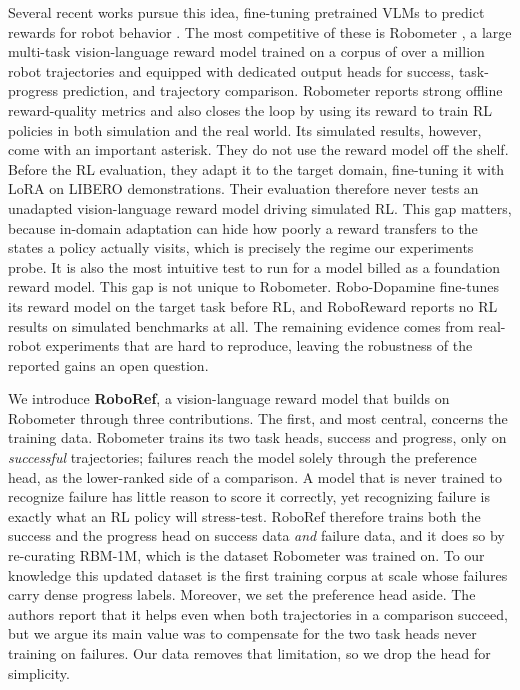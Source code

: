 Several recent works pursue this idea, fine-tuning pretrained VLMs to predict rewards for robot behavior \citep{robodopamine, roboreward, TRI-reward-model}. The most competitive of these is Robometer \citep{robometer}, a large multi-task vision-language reward model trained on a corpus of over a million robot trajectories and equipped with dedicated output heads for success, task-progress prediction, and trajectory comparison. Robometer reports strong offline reward-quality metrics and also closes the loop by using its reward to train RL policies in both simulation and the real world. Its simulated results, however, come with an important asterisk. They do not use the reward model off the shelf. Before the RL evaluation, they adapt it to the target domain, fine-tuning it with LoRA \citep{hu_lora_2022} on LIBERO demonstrations. Their evaluation therefore never tests an unadapted vision-language reward model driving simulated RL. This gap matters, because in-domain adaptation can hide how poorly a reward transfers to the states a policy actually visits, which is precisely the regime our experiments probe. It is also the most intuitive test to run for a model billed as a foundation reward model. This gap is not unique to Robometer. Robo-Dopamine \citep{robodopamine} fine-tunes its reward model on the target task before RL, and RoboReward \citep{roboreward} reports no RL results on simulated benchmarks at all. The remaining evidence comes from real-robot experiments that are hard to reproduce, leaving the robustness of the reported gains an open question.

We introduce \textbf{RoboRef}, a vision-language reward model that builds on Robometer through three contributions. The first, and most central, concerns the training data. Robometer trains its two task heads, success and progress, only on \emph{successful} trajectories; failures reach the model solely through the preference head, as the lower-ranked side of a comparison. A model that is never trained to recognize failure has little reason to score it correctly, yet recognizing failure is exactly what an RL policy will stress-test. RoboRef therefore trains both the success and the progress head on success data \textit{and} failure data, and it does so by re-curating RBM-1M, which is the dataset Robometer was trained on. To our knowledge this updated dataset is the first training corpus at scale whose failures carry dense progress labels. Moreover, we set the preference head aside. The authors report that it helps even when both trajectories in a comparison succeed, but we argue its main value was to compensate for the two task heads never training on failures. Our data removes that limitation, so we drop the head for simplicity.  

